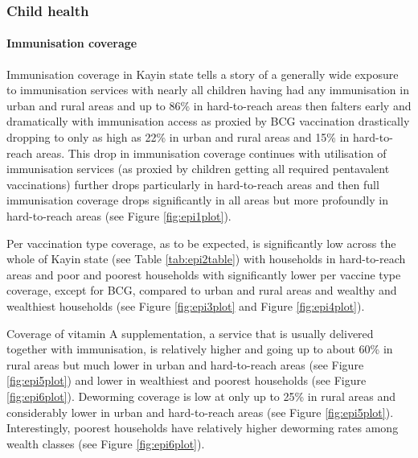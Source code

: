 \documentclass[12pt,a4paper]{article}
\let\oldparagraph\paragraph
\renewcommand{\paragraph}[1]{\oldparagraph{#1}\mbox{}}
\begin{document}
\hypertarget{chealth-results}{%
\subsubsection{Child health}\label{chealth-results}}

\hypertarget{epi-results}{%
\paragraph{Immunisation coverage}\label{epi-results}}

Immunisation coverage in Kayin state tells a story of a generally wide exposure to immunisation services with nearly all children having had any immunisation in urban and rural areas and up to 86\% in hard-to-reach areas then falters early and dramatically with immunisation access as proxied by BCG vaccination drastically dropping to only as high as 22\% in urban and rural areas and 15\% in hard-to-reach areas. This drop in immunisation coverage continues with utilisation of immunisation services (as proxied by children getting all required pentavalent vaccinations) further drops particularly in hard-to-reach areas and then full immunisation coverage drops significantly in all areas but more profoundly in hard-to-reach areas (see Figure \ref{fig:epi1plot}).

Per vaccination type coverage, as to be expected, is significantly low across the whole of Kayin state (see Table \ref{tab:epi2table}) with households in hard-to-reach areas and poor and poorest households with significantly lower per vaccine type coverage, except for BCG, compared to urban and rural areas and wealthy and wealthiest households (see Figure \ref{fig:epi3plot} and Figure \ref{fig:epi4plot}).

Coverage of vitamin A supplementation, a service that is usually delivered together with immunisation, is relatively higher and going up to about 60\% in rural areas but much lower in urban and hard-to-reach areas (see Figure \ref{fig:epi5plot}) and lower in wealthiest and poorest households (see Figure \ref{fig:epi6plot}). Deworming coverage is low at only up to 25\% in rural areas and considerably lower in urban and hard-to-reach areas (see Figure \ref{fig:epi5plot}). Interestingly, poorest households have relatively higher deworming rates among wealth classes (see Figure \ref{fig:epi6plot}).
\end{document}
